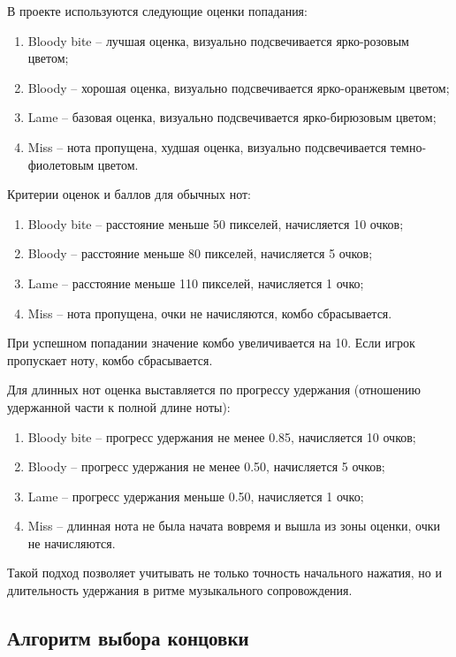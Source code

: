 \documentclass[utf8, russian]{eskdtext}
\numberwithin{equation}{section}
\begin{document}
В проекте используются следующие оценки попадания:

\begin{enumerate}
    \item Bloody bite -- лучшая оценка, визуально подсвечивается ярко-розовым цветом;
    \item Bloody -- хорошая оценка, визуально подсвечивается ярко-оранжевым цветом;
    \item Lame -- базовая оценка, визуально подсвечивается ярко-бирюзовым цветом;
    \item Miss -- нота пропущена, худшая оценка, визуально подсвечивается темно-фиолетовым цветом.
\end{enumerate}

Критерии оценок и баллов для обычных нот:

\begin{enumerate}
    \item Bloody bite -- расстояние меньше 50 пикселей, начисляется 10 очков;
    \item Bloody -- расстояние меньше 80 пикселей, начисляется 5 очков;
    \item Lame -- расстояние меньше 110 пикселей, начисляется 1 очко;
    \item Miss -- нота пропущена, очки не начисляются, комбо сбрасывается.
\end{enumerate}

При успешном попадании значение комбо увеличивается на 10. Если игрок пропускает ноту, комбо сбрасывается.

Для длинных нот оценка выставляется по прогрессу удержания (отношению удержанной части к полной длине ноты):

\begin{enumerate}
    \item Bloody bite -- прогресс удержания не менее 0.85, начисляется 10 очков;
    \item Bloody -- прогресс удержания не менее 0.50, начисляется 5 очков;
    \item Lame -- прогресс удержания меньше 0.50, начисляется 1 очко;
    \item Miss -- длинная нота не была начата вовремя и вышла из зоны оценки, очки не начисляются.
\end{enumerate}

Такой подход позволяет учитывать не только точность начального нажатия, но и длительность удержания в ритме музыкального сопровождения.

\subsection{Алгоритм выбора концовки}
\end{document}
